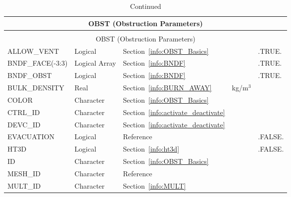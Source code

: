 \documentclass[11pt]{book}
\begin{document}
\begin{longtable}{@{\extracolsep{\fill}}|l|l|l|l|l|}
\caption[Obstruction parameters ({\ct OBST} namelist group)]{For more information see Section~\ref{info:OBST}.}
\label{tbl:OBST} \\
\hline
\multicolumn{5}{|c|}{{\ct OBST} (Obstruction Parameters)} \\
\hline \hline
\endfirsthead
\caption[]{Continued} \\
\hline
\multicolumn{5}{|c|}{{\ct OBST} (Obstruction Parameters)} \\
\hline \hline
\endhead
{\ct ALLOW\_VENT}         & Logical             & Section~\ref{info:OBST_Basics}            &           & {\ct .TRUE.}  \\ \hline
{\ct BNDF\_FACE(-3:3)}    & Logical Array       & Section~\ref{info:BNDF}                   &           & {\ct .TRUE.}  \\ \hline
{\ct BNDF\_OBST}          & Logical             & Section~\ref{info:BNDF}                   &           & {\ct .TRUE.}  \\ \hline
{\ct BULK\_DENSITY}       & Real                & Section~\ref{info:BURN_AWAY}              & kg/m$^3$  &               \\ \hline
{\ct COLOR    }           & Character           & Section~\ref{info:OBST_Basics}            &           &               \\ \hline
{\ct CTRL\_ID }           & Character           & Section~\ref{info:activate_deactivate}    &           &               \\ \hline
{\ct DEVC\_ID }           & Character           & Section~\ref{info:activate_deactivate}    &           &               \\ \hline
{\ct EVACUATION}          & Logical             & Reference~\cite{FDS_Evac_Users_Guide}     &           & {\ct .FALSE.} \\ \hline
{\ct HT3D}                & Logical             & Section~\ref{info:ht3d}                   &           & {\ct .FALSE.} \\ \hline
{\ct ID }                 & Character           & Section~\ref{info:OBST_Basics}            &           &               \\ \hline
{\ct MESH\_ID}            & Character           & Reference~\cite{FDS_Evac_Users_Guide}     &           &               \\ \hline
{\ct MULT\_ID }           & Character           & Section~\ref{info:MULT}                   &           &               \\ \hline

\end{longtable}
\end{document}
